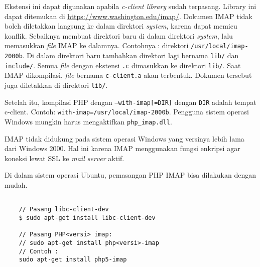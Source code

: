 Ekstensi ini dapat digunakan apabila \textit{c-client library} sudah terpasang. Library ini dapat ditemukan di \url{https://www.washington.edu/imap/}. Dokumen IMAP tidak boleh diletakkan langsung ke dalam direktori \textit{system}, karena dapat memicu konflik. Sebaiknya membuat direktori baru di dalam direktori \textit{system}, lalu memasukkan \textit{file} IMAP ke dalamnya. Contohnya : direktori \texttt{/usr/local/imap-2000b}. Di dalam direktori baru tambahkan direktori lagi bernama \texttt{lib/} dan \texttt{include/}. Semua \textit{file} dengan ekstensi \texttt{.c} dimasukkan ke direktori \texttt{lib/}. Saat IMAP dikompilasi, \textit{file} bernama \texttt{c-client.a} akan terbentuk. Dokumen tersebut juga diletakkan di direktori \texttt{lib/}.

Setelah itu, kompilasi PHP dengan \texttt{--with-imap[=DIR]} dengan \texttt{DIR} adalah tempat c-client. Contoh: \texttt{with-imap=/usr/local/imap-2000b}. Pengguna sistem operasi Windows mungkin harus mengaktifkan \texttt{php\_imap.dll}.

IMAP tidak didukung pada sistem operasi Windows yang versinya lebih lama dari Windows 2000. Hal ini karena IMAP menggunakan fungsi enkripsi agar koneksi lewat SSL ke \textit{mail server} aktif.

Di dalam sistem operasi Ubuntu, pemasangan PHP IMAP bisa dilakukan dengan mudah.
\begin{lstlisting}
	
	// Pasang libc-client-dev
	$ sudo apt-get install libc-client-dev

	// Pasang PHP<versi> imap:
	// sudo apt-get install php<versi>-imap
	// Contoh : 
	sudo apt-get install php5-imap
		
\end{lstlisting}

